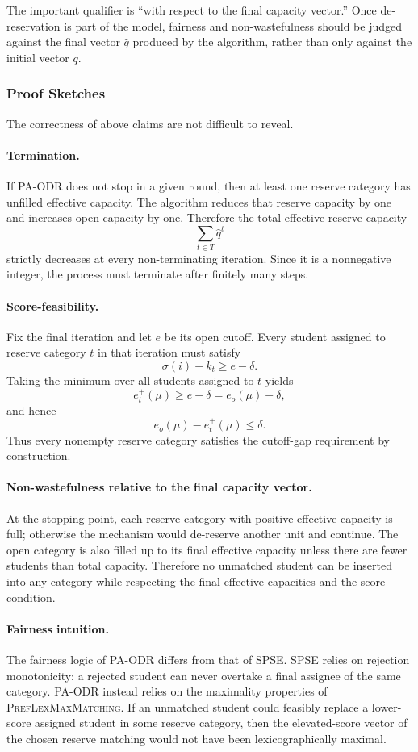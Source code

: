 \documentclass[12pt]{article}
\newcommand{\1}{\mathbf{1}}
\begin{document}
The important qualifier is ``with respect to the final capacity vector.'' Once de-reservation is part of the model, fairness and non-wastefulness should be judged against the final vector $\hat q$ produced by the algorithm, rather than only against the initial vector $q$.

\subsubsection{Proof Sketches}
The correctness of above claims are not difficult to reveal.

\paragraph{Termination.}
If PA-ODR does not stop in a given round, then at least one reserve category has unfilled effective capacity. The algorithm reduces that reserve capacity by one and increases open capacity by one. Therefore the total effective reserve capacity
\[
\sum_{t\in T}\hat q^t
\]
strictly decreases at every non-terminating iteration. Since it is a nonnegative integer, the process must terminate after finitely many steps.

\paragraph{Score-feasibility.}
Fix the final iteration and let $e$ be its open cutoff. Every student assigned to reserve category $t$ in that iteration must satisfy
\[
\sigma(i)+k_t\ge e-\delta.
\]
Taking the minimum over all students assigned to $t$ yields
\[
e_t^+(\mu)\ge e-\delta=e_o(\mu)-\delta,
\]
and hence
\[
e_o(\mu)-e_t^+(\mu)\le \delta.
\]
Thus every nonempty reserve category satisfies the cutoff-gap requirement by construction.

\paragraph{Non-wastefulness relative to the final capacity vector.}
At the stopping point, each reserve category with positive effective capacity is full; otherwise the mechanism would de-reserve another unit and continue. The open category is also filled up to its final effective capacity unless there are fewer students than total capacity. Therefore no unmatched student can be inserted into any category while respecting the final effective capacities and the score condition.

\paragraph{Fairness intuition.}
The fairness logic of PA-ODR differs from that of SPSE. SPSE relies on rejection monotonicity: a rejected student can never overtake a final assignee of the same category. PA-ODR instead relies on the maximality properties of \textsc{PrefLexMaxMatching}. If an unmatched student could feasibly replace a lower-score assigned student in some reserve category, then the elevated-score vector of the chosen reserve matching would not have been lexicographically maximal.
\end{document}
